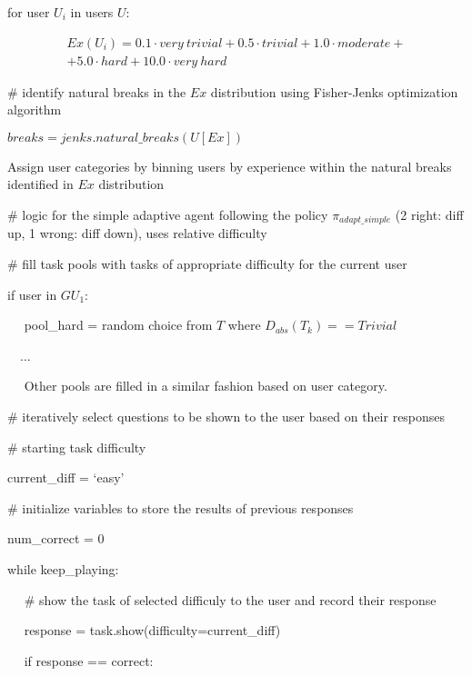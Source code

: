 for user $U_i$ in users $U$:

$\quad$
\begin{equation}
\begin{split}
    Ex(U_i) = 0.1 \cdot very~trivial +
    0.5 \cdot trivial +
    1.0 \cdot moderate + \\
    + 5.0 \cdot hard +
    10.0 \cdot very~hard
\end{split}
\end{equation}

\# identify natural breaks in the $Ex$ distribution using Fisher-Jenks optimization algorithm

$ breaks = jenks.natural\_breaks(U[Ex]) $

Assign user categories by binning users by experience within the natural breaks identified in $Ex$ distribution

\vspace{5mm}

\# logic for the simple adaptive agent following the policy $\pi_{adapt\_simple}$ (2 right: diff up, 1 wrong: diff down), uses relative difficulty

\vspace{5mm}

\# fill task pools with tasks of appropriate difficulty for the current user

if user in $GU_{1}$:

$\quad$ pool\_hard = random choice from $T$ where $D_{abs}(T_k) == Trivial$

$\quad$...

$\quad$ Other pools are filled in a similar fashion based on user category.

\newpage

\# iteratively select questions to be shown to the user based on their responses

\# starting task difficulty

current\_diff = `easy'

\# initialize variables to store the results of previous responses

num\_correct = 0

\vspace{5mm}

while keep\_playing:

$\quad$ \# show the task of selected difficuly to the user and record their response

$\quad$ response = task.show(difficulty=current\_diff)

$\quad$ if response == correct:

